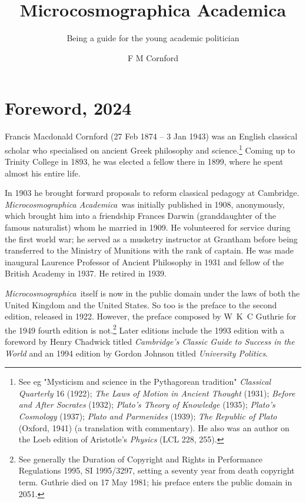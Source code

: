 \documentclass[12pt, oneside, b5paper]{memoir}
\title{Microcosmographica Academica}
\subtitle{Being a guide for the young academic politician}
\author{F M Cornford}
\date{First published 1908 \\
by Metcalfe \& Company Ltd, Cambridge
\vskip 2em
\textcopyright\ 2024 (GPL-2) by ifly6
}
\newcommand{\ma}{\textit{Microcosmographica Academica}\ }
\newcommand{\mashort}{\textit{Microcosmographica}\ }
\begin{document}
\begin{titlingpage}
	\maketitle
\end{titlingpage}

\frontmatter

\chapter{Foreword, 2024}

Francis Macdonald Cornford (27 Feb 1874 -- 3 Jan 1943) was an English classical scholar who specialised on ancient Greek philosophy and science.\footnote{See eg "Mysticism and science in the Pythagorean tradition" \emph{Classical Quarterly} 16 (1922); \emph{The Laws of Motion in Ancient Thought} (1931); \emph{Before and After Socrates} (1932); \emph{Plato's Theory of Knowledge} (1935); \emph{Plato's Cosmology} (1937); \emph{Plato and Parmenides} (1939); \emph{The Republic of Plato} (Oxford, 1941) (a translation with commentary). He also was an author on the Loeb edition of Aristotle's \emph{Physics} (LCL 228, 255).} Coming up to Trinity College in 1893, he was elected a fellow there in 1899, where he spent almost his entire life.

In 1903 he brought forward proposals to reform classical pedagogy at Cambridge. \ma was initially published in 1908, anonymously, which brought him into a friendship Frances Darwin (granddaughter of the famous naturalist) whom he married in 1909. He volunteered for service during the first world war; he served as a musketry instructor at Grantham before being transferred to the Ministry of Munitions with the rank of captain. He was made inaugural Laurence Professor of Ancient Philosophy in 1931 and fellow of the British Academy in 1937. He retired in 1939.

\mashort itself is now in the public domain under the laws of both the United Kingdom and the United States. So too is the preface to the second edition, released in 1922. However, the preface composed by W~K~C Guthrie for the 1949 fourth edition is not.\footnote{See generally the Duration of Copyright and Rights in Performance Regulations 1995, SI 1995/3297, setting a seventy year from death copyright term. Guthrie died on 17 May 1981; his preface enters the public domain in 2051.} Later editions include the 1993 edition with a foreword by Henry Chadwick titled \emph{Cambridge's Classic Guide to Success in the World} and an 1994 edition by Gordon Johnson titled \emph{University Politics}.
\end{document}
